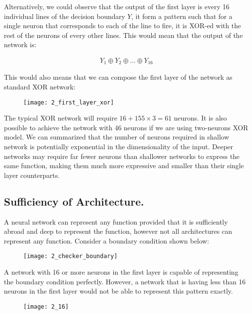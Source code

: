 \hfill\break
Alternatively, we could observe that the output of the first layer is every 16 individual lines of the decision boundary $Y$, it form a pattern such that for a single neuron that corresponds to each of the line to fire, it is XOR-ed with the rest of the neurons of every other lines. This would mean that the output of the network is:

\begin{align}
	Y_1 \oplus Y_2 \oplus ... \oplus Y_{16}
\end{align}

\hfill\break
This would also means that we can compose the first layer of the network as standard XOR network:

 \begin{figure}[H]
	\centering
	\texttt{[image: 2\_first\_layer\_xor]}
\end{figure}

\hfill\break
The typical XOR network will require $16 + 155\times 3 = 61$ neurons. It is also possible to achieve the network with 46 neurons if we are using two-neurons XOR model. We can summarized that the number of neurons required in shallow network is potentially exponential in the dimensionality of the input. Deeper networks may require far fewer neurons than shallower networks to express the same function, making them much more expressive and smaller than their single layer counterparts.

\subsection{Sufficiency of Architecture.}

A neural network can represent any function provided that it is sufficiently abroad and deep to represent the function, however not all architectures can represent any function. Consider a boundary condition shown below:

 \begin{figure}[H]
	\centering
	\texttt{[image: 2\_checker\_boundary]}
\end{figure}

\hfill\break
A network with 16 or more neurons in the first layer is capable of representing the boundary condition perfectly. However, a network that is having less than 16 neurons in the first layer would not be able to represent this pattern exactly. 

 \begin{figure}[H]
	\centering
	\texttt{[image: 2\_16]}
\end{figure}

